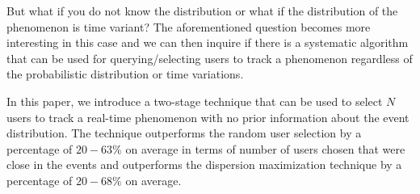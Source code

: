 \documentclass{acm_proc_article-sp}
\begin{document}
But what if you do not know the distribution or what if the distribution of the phenomenon is time variant? The aforementioned question becomes more interesting in this case and we can then inquire if there is a systematic algorithm that can be used for querying/selecting users to track a phenomenon regardless of the probabilistic distribution or time variations. \par
In this paper, we introduce a two-stage technique that can be used to select $N$ users to track a real-time phenomenon with no prior information about the event distribution. The technique outperforms the random user selection by a percentage of $20-63\%$ on average in terms of number of users chosen that were close in the events and outperforms the dispersion maximization technique by a percentage of $20-68\%$ on average.\par
\end{document}
